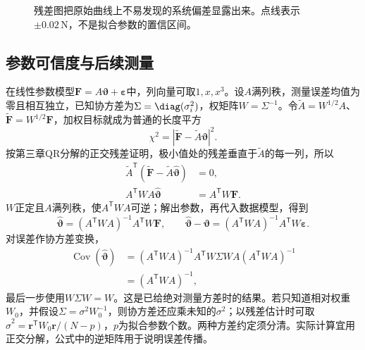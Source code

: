 \documentclass[11pt,openany,fontset=fandol]{ctexbook}
\theoremstyle{plain}\newtheorem{theorem}{定理}[chapter]\newtheorem{proposition}[theorem]{命题}
\theoremstyle{definition}\newtheorem{definition}{定义}[chapter]\newtheorem{example}{例}[chapter]
\theoremstyle{remark}\newtheorem*{remark}{说明}
\newcommand{\vct}[1]{\bm{#1}}\newcommand{\Rea}{\operatorname{Re}}\newcommand{\Ima}{\operatorname{Im}}
\begin{document}
\begin{figure}[htbp]\centering
{}
\caption{残差图把原始曲线上不易发现的系统偏差显露出来。点线表示 $\pm0.02\,\mathrm N$，不是拟合参数的置信区间。}
\label{fig:orig-090}
\end{figure}

\subsection{参数可信度与后续测量}
在线性参数模型$\vct F=A\vct\vartheta+\vct\varepsilon$中，列向量可取$1,x,x^3$。设$A$满列秩，测量误差均值为零且相互独立，已知协方差为$\Sigma=\diag(\sigma_i^2)$，权矩阵$W=\Sigma^{-1}$。令$\widetilde A=W^{1/2}A$、$\widetilde{\vct F}=W^{1/2}\vct F$，加权目标就成为普通的长度平方
\[
\chi^2=|\widetilde{\vct F}-\widetilde A\vct\vartheta|^2.
\]
按第三章QR分解的正交残差证明，极小值处的残差垂直于$\widetilde A$的每一列，所以
\[
\begin{aligned}
\widetilde A^{\mathsf T}(\widetilde{\vct F}-\widetilde A\widehat{\vct\vartheta})&=0,\\
A^{\mathsf T}WA\widehat{\vct\vartheta}&=A^{\mathsf T}W\vct F.
\end{aligned}
\]
$W$正定且$A$满列秩，使$A^{\mathsf T}WA$可逆；解出参数，再代入数据模型，得到
\[\widehat{\vct\vartheta}=(A^{\mathsf T}WA)^{-1}A^{\mathsf T}W\vct F,\qquad
\widehat{\vct\vartheta}-\vct\vartheta=(A^{\mathsf T}WA)^{-1}A^{\mathsf T}W\vct\varepsilon.\]
对误差作协方差变换，
\[\begin{aligned}
\operatorname{Cov}(\widehat{\vct\vartheta})
&=(A^{\mathsf T}WA)^{-1}A^{\mathsf T}W\Sigma WA(A^{\mathsf T}WA)^{-1}\\
&=(A^{\mathsf T}WA)^{-1},
\end{aligned}\]
最后一步使用$W\Sigma W=W$。这是已给绝对测量方差时的结果。若只知道相对权重$W_0$，并假设$\Sigma=\sigma^2W_0^{-1}$，则协方差还应乘未知的$\sigma^2$；以残差估计时可取$\widehat\sigma^2=\vct r^{\mathsf T}W_0\vct r/(N-p)$，$p$为拟合参数个数。两种方差约定须分清。实际计算宜用正交分解，公式中的逆矩阵用于说明误差传播。
\end{document}
